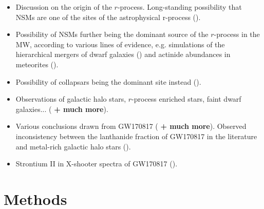 \documentclass[twocolumn]{aastex63}
\begin{document}
\begin{itemize}
    \item Discussion on the origin of the $r$-process. Long-standing possibility that NSMs are one of the sites of the astrophysical r-process (\citealt{lattimer74, eichler89, freiburghaus99}). 
    
    \item Possibility of NSMs further being the dominant source of the $r$-process in the MW, according to various lines of evidence, e.g. simulations of the hierarchical mergers of dwarf galaxies (\citealt{ishimaru15}) and actinide abundances in meteorites (\citealt{bartos19}).
    
    
    \item Possibility of collapsars being the dominant site instead (\citealt{siegel19}).
    
    
    \item Observations of galactic halo stars, $r$-process enriched stars, faint dwarf galaxies... (\citealt{ji16, cote18} \textbf{+ much more}).
    
    
    \item Various conclusions drawn from GW170817 (\citealt{kasen17, pian17, smartt17, cote18, rosswog18} \textbf{+ much more}). Observed inconsistency between the lanthanide fraction of GW170817 in the literature and metal-rich galactic halo stars (\citealt{ji19}).

    
    \item Strontium II in X-shooter spectra of GW170817 (\citealt{watson19}).
\end{itemize}

\section{Methods}\label{sec:methods}
\end{document}
